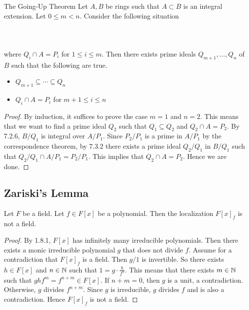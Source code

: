 \documentclass[a4paper]{article}
\begin{document}
\begin{thm}{The Going-Up Theorem}{} Let $A,B$ be rings such that $A\subset B$ is an integral extension. Let $0\leq m<n$. Consider the following situation \\~\\
\\~\\
where $Q_i\cap A=P_i$ for $1\leq i\leq m$. Then there exists prime ideals $Q_{m+1},\dots,Q_n$ of $B$ such that the following are true. 
\begin{itemize}
\item $Q_{m+1}\subseteq\cdots\subseteq Q_n$
\item $Q_i\cap A=P_i$ for $m+1\leq i\leq n$
\end{itemize} 
\begin{proof}
By induction, it suffices to prove the case $m=1$ and $n=2$. This means that we want to find a prime ideal $Q_2$ such that $Q_1\subseteq Q_2$ and $Q_2\cap A=P_2$. By 7.2.6, $B/Q_1$ is integral over $A/P_1$. Since $P_2/P_1$ is a prime in $A/P_1$ by the correspondence theorem, by 7.3.2 there exists a prime ideal $Q_2/Q_1$ in $B/Q_1$ such that $Q_2/Q_1\cap A/P_1=P_2/P_1$. This implies that $Q_2\cap A=P_2$. Hence we are done. 
\end{proof}
\end{thm}

\subsection{Zariski's Lemma}
\begin{lmm}{}{} Let $F$ be a field. Let $f\in F[x]$ be a polynomial. Then the localization $F[x]_f$ is not a field. 
\begin{proof}
By 1.8.1, $F[x]$ has infinitely many irreducible polynomials. Then there exists a monic irreducible polynomial $g$ that does not divide $f$. Assume for a contradiction that $F[x]_f$ is a field. Then $g/1$ is invertible. So there exists $h\in F[x]$ and $n\in\mathbb{N}$ such that $1=g\cdot\frac{h}{f^n}$. This means that there exists $m\in\mathbb{N}$ such that $ghf^m=f^{n+m}\in F[x]$. If $n+m=0$, then $g$ is a unit, a contradiction. Otherwise, $g$ divides $f^{n+m}$. Since $g$ is irreducible, $g$ divides $f$ and is also a contradiction. Hence $F[x]_f$ is not a field. 
\end{proof}
\end{lmm}
\end{document}
